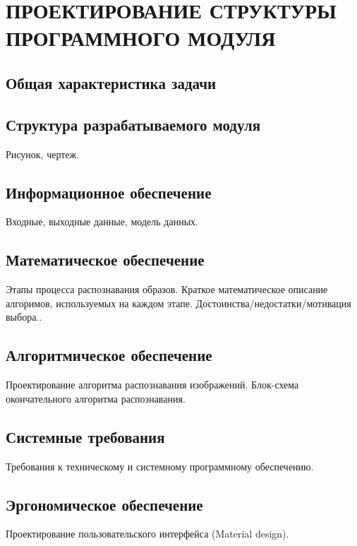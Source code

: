 \section[Проектирование структуры программного модуля]{%
  ПРОЕКТИРОВАНИЕ СТРУКТУРЫ \\ ПРОГРАММНОГО МОДУЛЯ
}\label{sec:design}

\subsection{Общая характеристика задачи}

\subsection{Структура разрабатываемого модуля}

Рисунок, чертеж.

\subsection{Информационное обеспечение}

Входные, выходные данные, модель данных.

\subsection{Математическое обеспечение}

Этапы процесса распознавания образов.
Краткое математическое описание алгоримов, используемых на каждом этапе.
Достоинства/недостатки/мотивация выбора..

\subsection{Алгоритмическое обеспечение}

Проектирование алгоритма распознавания изображений.
Блок-схема окончательного алгоритма распознавания.

\subsection{Системные требования}

Требования к техническому и системному программному обеспечению.

\subsection{Эргономическое обеспечение}

Проектирование пользовательского интерфейса (Material design).
